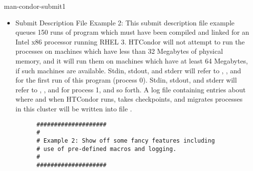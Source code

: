\begin{ManPage}{}{man-condor-submit}{1}
\begin{itemize}
\begin{verbatim}
      Arguments      = 45 6000                                               
      Output  = foo.out2                                                     
      Error   = foo.err2
      Queue                   
\end{verbatim}
\normalsize

Or you can get the same results as the above submit file by using a list of arguments with the Queue statement

\footnotesize
\begin{verbatim}
      ####################
      #
      # submit description file
      # Example 1b: queuing multiple jobs with differing
      # command line arguments and output files, alternate syntax
      #                                                                      
      ####################                                                   

      Executable     = foo
      Universe       = vanilla

      # generate different output and error filenames for each process
      Output  = foo.out$(Process)
      Error   = foo.err$(Process)

      Queue Arguments From (
        15 2000
        30 2000
        45 6000
      )

\end{verbatim}
\normalsize

\item{Submit Description File Example 2:} This submit description file
example queues 150
runs of program  which must have been compiled and linked for
an Intel x86 processor running RHEL 3.
HTCondor will not attempt
to run the processes on machines which have less than 32 Megabytes of
physical memory, and it will run them on machines which have at least 64
Megabytes, if such machines are available.
Stdin, stdout, and stderr will
refer to , , and  for the first run
of this program (process 0).
Stdin, stdout, and stderr will refer to
, , and  for process 1, and so forth.
A log file containing entries
about where and when HTCondor runs, takes checkpoints, and migrates processes
in this cluster will be written into file .

\footnotesize
\begin{verbatim}
      ####################                                                    
      #                                                                       
      # Example 2: Show off some fancy features including
      # use of pre-defined macros and logging.                                
      #                                                                       
      ####################                                                    
                                                                          

\end{verbatim}
\end{itemize}
\end{ManPage}
